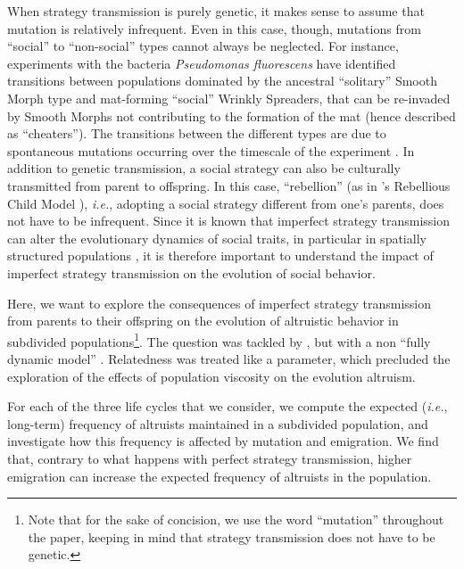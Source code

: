 \documentclass[11pt, letterpaper]{article}
\newcommand{\ie}{\textit{i.e.}}
\newcommand{\eg}{\textit{e.g.}}
\begin{document}
When strategy transmission is purely genetic, it makes sense to assume that mutation is relatively infrequent. Even in this case, though, mutations from ``social'' to ``non-social'' types cannot always be neglected. For instance, experiments with the bacteria \textit{Pseudomonas fluorescens} have identified transitions between populations dominated by the ancestral ``solitary'' Smooth Morph type and mat-forming ``social'' Wrinkly Spreaders, that can be re-invaded by Smooth Morphs not contributing to the formation of the mat (hence described as ``cheaters''). The transitions between the different types are due to spontaneous mutations occurring over the timescale of the experiment \citep{Hammerschmidt2014}. In addition to genetic transmission, a social strategy can also be culturally transmitted from parent to offspring. In this case, ``rebellion'' (as in \citeauthor{Frank1997}'s Rebellious Child Model \citep{Frank1997}), \ie, adopting a social strategy different from one's parents, does not have to be infrequent. Since it is known that imperfect strategy transmission can alter the evolutionary dynamics of social traits, in particular in spatially structured populations \citep[see \eg,][for graph-structured populations]{Allen2012,Debarre2017}, it is therefore important to understand the impact of imperfect strategy transmission on the evolution of social behavior. 

Here, we want to explore the consequences of imperfect strategy transmission from parents to their offspring on the evolution of altruistic behavior in subdivided populations\footnote{Note that for the sake of concision, we use the word ``mutation'' throughout the paper, keeping in mind that strategy transmission does not have to be genetic. }. The question was tackled by \citet{Frank1997}, but with a non ``fully dynamic model'' \citep[][legend of Fig.7]{Frank1997}. Relatedness was treated like a parameter, which precluded the exploration of the effects of population viscosity on the evolution altruism. 

For each of the three life cycles that we consider, we compute the expected (\ie, long-term) frequency of altruists maintained in a subdivided population, and investigate how this frequency is affected by mutation and emigration. We find that, contrary to what happens with perfect strategy transmission, higher emigration can increase the expected frequency of altruists in the population. 
\end{document}
